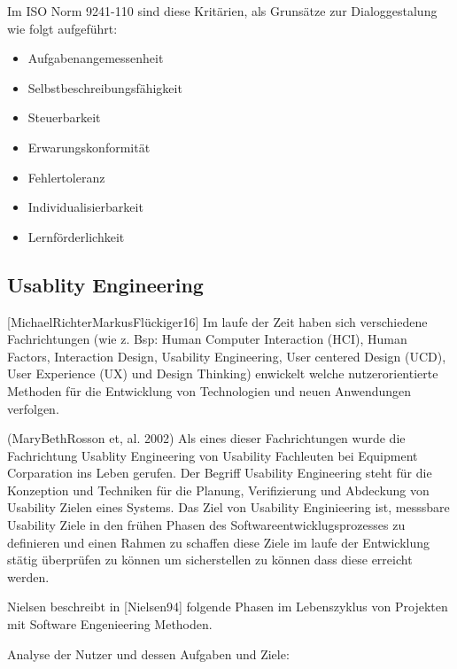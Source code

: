 Im ISO Norm  9241-110 sind diese Kritärien, als Grunsätze zur Dialoggestalung wie folgt aufgeführt: %

\begin{itemize}
	\item Aufgabenangemessenheit
	\item Selbstbeschreibungsfähigkeit
	\item Steuerbarkeit
	\item Erwarungskonformität
	\item Fehlertoleranz
	\item Individualisierbarkeit
	\item Lernförderlichkeit
\end{itemize}


\subsection{Usablity Engineering}

[MichaelRichterMarkusFlückiger16]  Im laufe der Zeit haben sich verschiedene Fachrichtungen (wie z. Bsp: Human Computer Interaction (HCI), Human Factors, Interaction Design, Usability Engineering, 
User centered Design (UCD), User Experience (UX) und Design Thinking)  enwickelt welche nutzerorientierte Methoden für die Entwicklung von Technologien und neuen Anwendungen verfolgen. 

(MaryBethRosson et, al. 2002) Als eines dieser Fachrichtungen wurde die Fachrichtung Usablity Engineering von Usability Fachleuten bei Equipment Corparation ins Leben gerufen.  
Der Begriff Usability Engineering steht für die Konzeption und Techniken für die Planung, Verifizierung und Abdeckung von Usability Zielen eines Systems. Das Ziel von Usability Enginieering ist, 
messsbare Usability Ziele in den frühen Phasen des Softwareentwicklugsprozesses zu definieren und einen Rahmen zu schaffen diese Ziele im laufe der Entwicklung stätig überprüfen zu können 
um sicherstellen zu können dass diese erreicht werden.

Nielsen beschreibt in [Nielsen94] folgende Phasen im Lebenszyklus von Projekten mit Software Engenieering Methoden.

Analyse der Nutzer und dessen Aufgaben und Ziele:  

